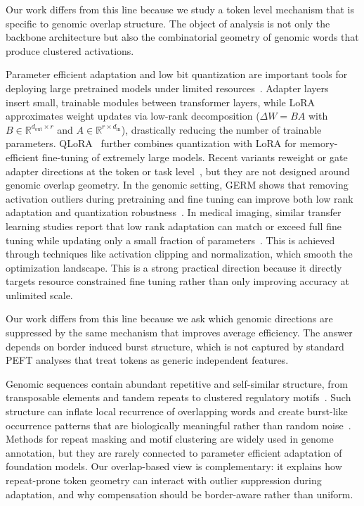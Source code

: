 \documentclass[12pt,letterpaper]{article}
\begin{document}
Our work differs from this line because we study a token level mechanism that is specific to genomic overlap structure. The object of analysis is not only the backbone architecture but also the combinatorial geometry of genomic words that produce clustered activations.

Parameter efficient adaptation and low bit quantization are important tools for deploying large pretrained models under limited resources~\cite{adapters2021,lora2022,qlora2023,lian2024medpeft}. Adapter layers~\cite{adapters2021} insert small, trainable modules between transformer layers, while LoRA~\cite{lora2022} approximates weight updates via low-rank decomposition ($\Delta W = B A$ with $B \in \mathbb{R}^{d_{\mathrm{out}}\times r}$ and $A \in \mathbb{R}^{r\times d_{\mathrm{in}}}$), drastically reducing the number of trainable parameters. QLoRA~\cite{qlora2023} further combines quantization with LoRA for memory-efficient fine-tuning of extremely large models. Recent variants reweight or gate adapter directions at the token or task level~\cite{stickland2019bert,ilharco2022editing,he2022unified}, but they are not designed around genomic overlap geometry. In the genomic setting, GERM shows that removing activation outliers during pretraining and fine tuning can improve both low rank adaptation and quantization robustness~\cite{germ2025}. In medical imaging, similar transfer learning studies report that low rank adaptation can match or exceed full fine tuning while updating only a small fraction of parameters~\cite{lian2024medpeft,yang2023hypernet,liu2025imitate}. This is achieved through techniques like activation clipping and normalization, which smooth the optimization landscape. This is a strong practical direction because it directly targets resource constrained fine tuning rather than only improving accuracy at unlimited scale.

Our work differs from this line because we ask which genomic directions are suppressed by the same mechanism that improves average efficiency. The answer depends on border induced burst structure, which is not captured by standard PEFT analyses that treat tokens as generic independent features.

Genomic sequences contain abundant repetitive and self-similar structure, from transposable elements and tandem repeats to clustered regulatory motifs~\cite{encode2012integrated,jurka2005repbase,smit1996repeatmasker}. Such structure can inflate local recurrence of overlapping words and create burst-like occurrence patterns that are biologically meaningful rather than random noise~\cite{zhou2015predicting,Kinney2010}. Methods for repeat masking and motif clustering are widely used in genome annotation, but they are rarely connected to parameter efficient adaptation of foundation models. Our overlap-based view is complementary: it explains how repeat-prone token geometry can interact with outlier suppression during adaptation, and why compensation should be border-aware rather than uniform.
\end{document}
